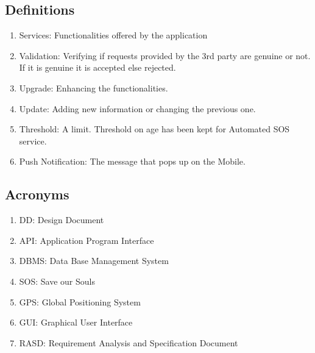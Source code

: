 \subsection{Definitions}
\begin{enumerate}
\item Services: Functionalities offered by the application
\item Validation: Verifying if requests provided by the 3rd party are genuine or not. If it is genuine it is accepted else rejected.
\item Upgrade: Enhancing the functionalities. 
\item Update: Adding new information or changing the previous one.
\item Threshold: A limit. Threshold on age has been kept for Automated SOS service.
\item Push Notification: The message that pops up on the Mobile. 
\end{enumerate}

\subsection{Acronyms}
\begin{enumerate}
\item DD: Design Document
\item API: Application Program Interface
\item DBMS: Data Base Management System
\item SOS: Save our Souls
\item GPS: Global Positioning System
\item GUI: Graphical User Interface
\item RASD: Requirement Analysis and Specification Document
\end{enumerate}


